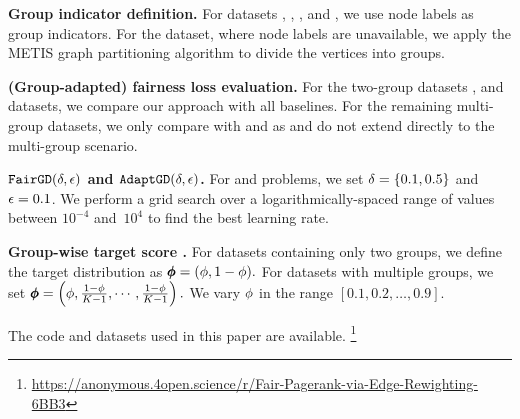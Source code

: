 \documentclass[sigconf, anonymous, review]{acmart}
\begin{document}
\vspace{1mm}
\noindent
\textbf{Group indicator definition.} 
For datasets \book, \blogs, \mind, and \twitter, we use node labels as group indicators. For the \slashdot dataset, where node labels are unavailable, we apply the METIS graph partitioning algorithm \cite{karypis_metis_1997} to divide the vertices into groups.

\vspace{1mm}
\noindent
\textbf{(Group-adapted) fairness loss evaluation.} 
For the two-group datasets \blogs, \mind and \twitter datasets, we compare our approach with all baselines.
For the remaining multi-group datasets, we only compare with \fairwalk and \crosswalk as \lfpru and \lfprn do not  extend directly to the multi-group scenario.

\vspace{1mm}
\noindent
\textbf{${\texttt{FairGD}}(\delta,\epsilon)$ and ${\texttt{AdaptGD}}(\delta, \epsilon)$.}
For \gaphiPageRank and \resgaphiPageRank problems, we set $\delta = \{ 0.1, 0.5\}$ and $\epsilon = 0.1$. 
We perform a grid search over a logarithmic\-al\-ly-spaced range of values between $10^{-4}$ and~$10^4$
to find the best learning rate.

\vspace{1mm}
\noindent
\textbf{Group-wise target \pagerank score \groupDist.}
For datasets containing only two groups, we define the target \pagerank distribution as 
$ \pmb{\phi} = (\phi, 1-\phi). $ 
For datasets with multiple groups, we set 
$ \pmb{\phi} = \left(\phi, \frac{1-\phi}{K-1}, \cdots, \frac{1-\phi}{K-1}\right). $ 
We vary \(\phi\) in the range  $ [0.1, 0.2, \dots, 0.9] $. 

\vspace{1mm}
The code and datasets used in this paper are available.%
\footnote{\url{https://anonymous.4open.science/r/Fair-Pagerank-via-Edge-Rewighting-6BB3}}

\end{document}
